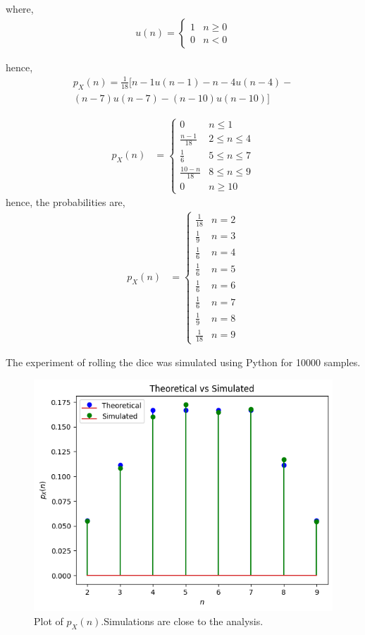 \documentclass[journal,12pt,twocolumn]{IEEEtran}
\theoremstyle{remark}
\begin{document}
where,
\begin{align}
u(n) =
\begin{cases}
1 & n \ge 0
\\
0 & n < 0
\end{cases}
\end{align}

hence,
\begin{multline}
p_{X}(n) = \frac{1}{18}[{{n-1}u(n-1)-{n-4}u(n-4)-}\\
              {(n-7)u(n-7)-(n-10)u(n-10)}]
\end{multline}

\begin{align}
  p_X(n) &= 
  \begin{cases}
  0 & n \le 1
  \\
  \frac{n-1}{18} &  2 \le n \le  4
  \\
  \frac{1}{6} & 5 \le n \le 7
  \\
  \frac{10-n}{18} & 8 \le n \le 9
  \\
  0 & n \ge 10
  \end{cases}
  \end{align}
hence, the probabilities are,
\begin{align}
  p_X(n) &= 
\begin{cases}
   \frac{1}{18} & n = 2 \\
   \frac{1}{9} & n = 3 \\
   \frac{1}{6} & n = 4 \\
   \frac{1}{6} & n = 5 \\
   \frac{1}{6} & n = 6 \\
   \frac{1}{6} & n = 7 \\
   \frac{1}{9} & n = 8 \\
   \frac{1}{18} & n = 9 
\end{cases}
\end{align}

\bigskip
The experiment of rolling the dice was simulated using Python for 10000 samples.  
%
\begin{figure}[!ht]
\centering
\includegraphics[width=\columnwidth]{./figs/pmf.png}
\caption{Plot of $p_X(n)$.Simulations are close to the analysis. }
\end{figure}
\end{document}
